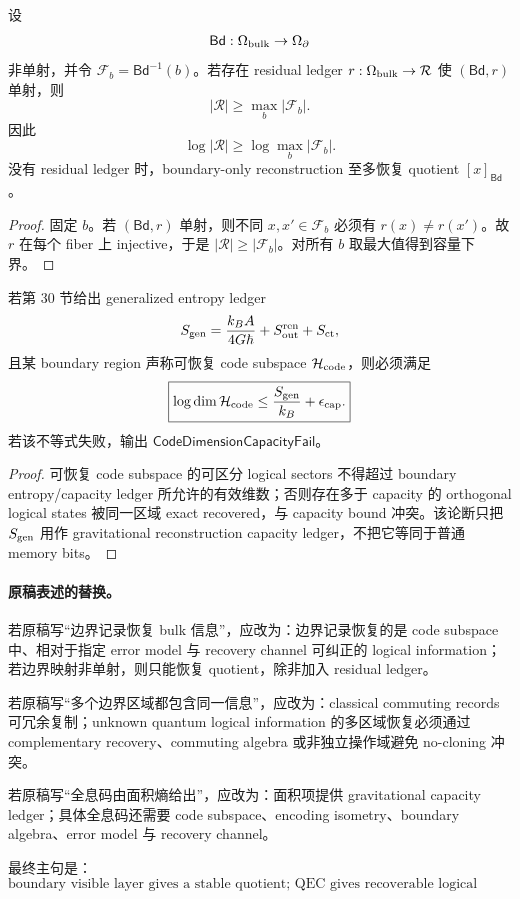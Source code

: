 \begin{theorem}\label{thm:typed-address-biaxial-completion-hidden-fiber-exactification}
设
\[
\mathsf{Bd}:\Omega_{\rm bulk}\to\Omega_\partial
\]
非单射，并令 \(\mathcal F_b=\mathsf{Bd}^{-1}(b)\)。若存在 residual ledger \(r:\Omega_{\rm bulk}\to\mathcal R\) 使 \((\mathsf{Bd},r)\) 单射，则
\[
\boxed{
|\mathcal R|
\ge
\max_b|\mathcal F_b|.
}
\]
因此
\[
\boxed{
\log|\mathcal R|
\ge
\log\max_b|\mathcal F_b|.
}
\]
没有 residual ledger 时，boundary-only reconstruction 至多恢复 quotient \([x]_{\mathsf{Bd}}\)。
\end{theorem}

\begin{proof}
固定 \(b\)。若 \((\mathsf{Bd},r)\) 单射，则不同 \(x,x'\in\mathcal F_b\) 必须有 \(r(x)\ne r(x')\)。故 \(r\) 在每个 fiber 上 injective，于是 \(|\mathcal R|\ge|\mathcal F_b|\)。对所有 \(b\) 取最大值得到容量下界。
\end{proof}

\begin{theorem}\label{thm:typed-address-biaxial-completion-entropy-capacity-consistency}
若第 30 节给出 generalized entropy ledger
\[
S_{\rm gen}
=
\frac{k_BA}{4G\hbar}
+S_{\rm out}^{\rm ren}
+S_{\rm ct},
\]
且某 boundary region 声称可恢复 code subspace \(\mathcal H_{\rm code}\)，则必须满足
\[
\boxed{
\log\dim\mathcal H_{\rm code}
\le
\frac{S_{\rm gen}}{k_B}
+\epsilon_{\rm cap}.
}
\]
若该不等式失败，输出 \(\mathsf{CodeDimensionCapacityFail}\)。
\end{theorem}

\begin{proof}
可恢复 code subspace 的可区分 logical sectors 不得超过 boundary entropy/capacity ledger 所允许的有效维数；否则存在多于 capacity 的 orthogonal logical states 被同一区域 exact recovered，与 capacity bound 冲突。该论断只把 \(S_{\rm gen}\) 用作 gravitational reconstruction capacity ledger，不把它等同于普通 memory bits。
\end{proof}

\paragraph{原稿表述的替换。}
若原稿写“边界记录恢复 bulk 信息”，应改为：边界记录恢复的是 code subspace 中、相对于指定 error model 与 recovery channel 可纠正的 logical information；若边界映射非单射，则只能恢复 quotient，除非加入 residual ledger。

若原稿写“多个边界区域都包含同一信息”，应改为：classical commuting records 可冗余复制；unknown quantum logical information 的多区域恢复必须通过 complementary recovery、commuting algebra 或非独立操作域避免 no-cloning 冲突。

若原稿写“全息码由面积熵给出”，应改为：面积项提供 gravitational capacity ledger；具体全息码还需要 code subspace、encoding isometry、boundary algebra、error model 与 recovery channel。

最终主句是：
\[
\boxed{
\text{boundary visible layer gives a stable quotient; QEC gives recoverable logical information only after the code subspace, error model, recovery channel, and residual ledger close.}
}
\]
